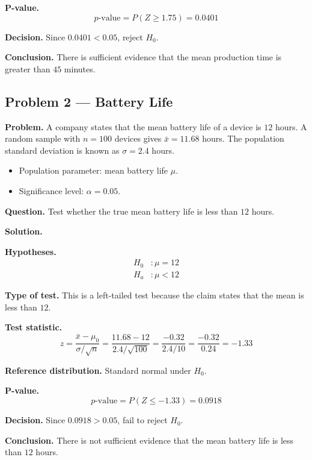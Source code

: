 \begin{ExamProblems}
\textbf{P-value.}
\[
p\text{-value}=P(Z\ge 1.75)=0.0401
\]

\textbf{Decision.} Since \(0.0401<0.05\), reject \(H_0\).

\textbf{Conclusion.} There is sufficient evidence that the mean production time is greater than \(45\) minutes.

\hypertarget{c5-ex2}{}
\item
\subsection*{Problem 2 — Battery Life}

\textbf{Problem.} A company states that the mean battery life of a device is \(12\) hours. A random sample with \(n=100\) devices gives \(\bar{x}=11.68\) hours. The population standard deviation is known as \(\sigma=2.4\) hours.
\begin{itemize}
    \item Population parameter: mean battery life \(\mu\).
    \item Significance level: \(\alpha=0.05\).
\end{itemize}

\textbf{Question.} Test whether the true mean battery life is less than \(12\) hours.

\textbf{Solution.}

\textbf{Hypotheses.}
\[
\begin{aligned}
H_0&: \mu = 12 \\
H_a&: \mu < 12
\end{aligned}
\]

\textbf{Type of test.} This is a left-tailed test because the claim states that the mean is less than \(12\).

\textbf{Test statistic.}
\[
z = \frac{\bar{x}-\mu_0}{\sigma/\sqrt{n}} = \frac{11.68-12}{2.4/\sqrt{100}} = \frac{-0.32}{2.4/10} = \frac{-0.32}{0.24} = -1.33
\]

\textbf{Reference distribution.} Standard normal under \(H_0\).

\textbf{P-value.}
\[
p\text{-value}=P(Z\le -1.33)=0.0918
\]

\textbf{Decision.} Since \(0.0918>0.05\), fail to reject \(H_0\).

\textbf{Conclusion.} There is not sufficient evidence that the mean battery life is less than \(12\) hours.

\hypertarget{c5-ex3}{}
\item

\end{ExamProblems}
